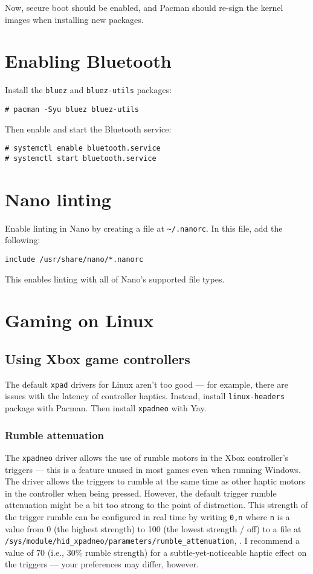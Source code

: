 \documentclass[a4paper]{article}
\begin{document}
Now, secure boot should be enabled, and Pacman should re-sign the kernel images when installing new packages.

\section{Enabling Bluetooth}

Install the \lstinline|bluez| and \lstinline|bluez-utils| packages:
\begin{lstlisting}
# pacman -Syu bluez bluez-utils
\end{lstlisting}

Then enable and start the Bluetooth service:
\begin{lstlisting}
# systemctl enable bluetooth.service
# systemctl start bluetooth.service
\end{lstlisting}

\section{Nano linting}

Enable linting in Nano by creating a file at \lstinline|~/.nanorc|.
In this file, add the following:
\begin{lstlisting}
include /usr/share/nano/*.nanorc
\end{lstlisting}
This enables linting with all of Nano's supported file types.

\section{Gaming on Linux}

\subsection{Using Xbox game controllers}

The default \lstinline|xpad| drivers for Linux aren't too good --- for example, there are issues with the latency of controller haptics.
Instead, install \lstinline|linux-headers| package with Pacman.
Then install \lstinline|xpadneo| with Yay.

\subsubsection{Rumble attenuation}

The \lstinline|xpadneo| driver allows the use of rumble motors in the Xbox controller's triggers --- this is a feature unused in most games even when running Windows.
The driver allows the triggers to rumble at the same time as other haptic motors in the controller when being pressed.
However, the default trigger rumble attenuation might be a bit too strong to the point of distraction.
This strength of the trigger rumble can be configured in real time by writing \lstinline|0,n|  where \lstinline|n| is a value from 0 (the highest strength) to 100 (the lowest strength / off) to a file at \lstinline|/sys/module/hid_xpadneo/parameters/rumble_attenuation|, \cite{xpadneo-troubleshooting}.
I recommend a value of 70 (i.e., 30\% rumble strength) for a subtle-yet-noticeable haptic effect on the triggers --- your preferences may differ, however.
\end{document}
